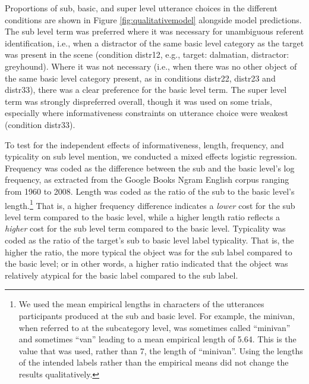 \documentclass[10pt,letterpaper]{article}
\newcommand{\figref}[1]{Figure \ref{#1}}
\begin{document}
Proportions of sub, basic, and super level utterance choices in the different conditions are shown in \figref{fig:qualitativemodel} alongside model predictions. The sub level term was preferred where it was necessary for unambiguous referent identification, i.e., when a distractor of the same basic level category as the target was present in the scene (condition distr12, e.g., target: dalmatian, distractor: greyhound). Where it was not necessary (i.e., when there was no other object of the same basic level category present, as in conditions distr22, distr23 and distr33), there was a clear preference for the basic level term. The super level term was strongly dispreferred overall, though it was used on some trials, especially where informativeness constraints on utterance choice were weakest (condition distr33). 
%

To test for the independent effects of informativeness, length, frequency, and typicality on sub level mention, we conducted a mixed effects logistic regression. Frequency was coded as the difference between the sub and the basic level's log frequency, as extracted from the Google Books Ngram English corpus ranging from 1960 to 2008. Length was coded as the ratio of the sub to the basic level's length.\footnote{We used the mean empirical lengths in characters of the utterances participants produced at the sub and basic level. For example, the minivan, when referred to at the subcategory level, was sometimes called ``minivan'' and sometimes ``van'' leading to a mean empirical length of 5.64. This is the value that was used, rather than 7, the length of ``minivan''. Using the lengths of the intended labels rather than the empirical means did not change the results qualitatively.} That is, a higher frequency difference indicates a \emph{lower} cost for the sub level term compared to the basic level, while a higher length ratio reflects a \emph{higher} cost for the sub level term compared to the basic level. Typicality was coded as the ratio of the target's sub to basic level label typicality. That is, the higher the ratio, the more typical the object was for the sub label compared to the basic level; or in other words, a higher ratio indicated that the object was relatively atypical for the basic label compared to the sub label.
\end{document}
